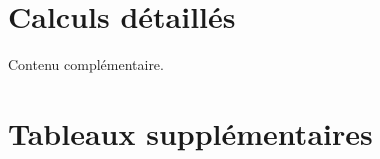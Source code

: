 \documentclass[../main.tex]{subfiles}
\begin{document}

\chapter{Calculs détaillés}
 
Contenu complémentaire.

\landscapemode
\chapter{Tableaux supplémentaires}


\portraitmode
\end{document}

